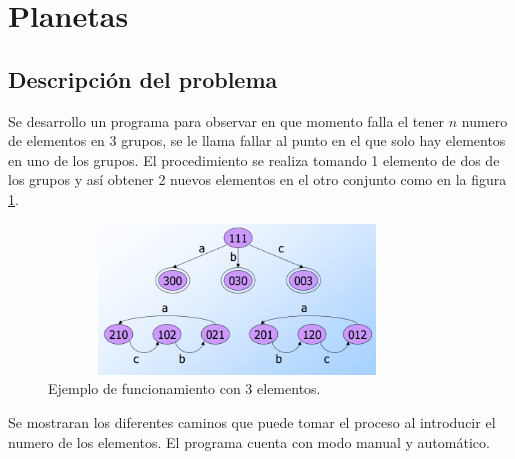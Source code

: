 \section{Planetas}
	\subsection{Descripción del problema}
	Se desarrollo un programa para observar en que momento falla el tener $n$ numero de elementos en 3 grupos, se le llama fallar al punto en el que solo hay elementos en uno de los grupos.
	El procedimiento se realiza tomando 1 elemento de dos de los grupos y así obtener 2 nuevos elementos en el otro conjunto como en la figura \ref{fig:marcianos}.
	\begin{figure}[H]
		\begin{center}
			\includegraphics[width=10cm, height=4cm]{img/marcianos.png}
			\caption{Ejemplo de funcionamiento con 3 elementos.\cite{WEB}}
			\label{fig:marcianos}
		\end{center}
	\end{figure}
	Se mostraran los diferentes caminos que puede tomar el proceso al introducir el numero de los elementos. El programa cuenta con modo manual y automático.
